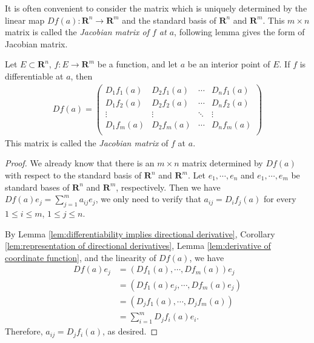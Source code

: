 It is often convenient to consider the matrix which is uniquely determined by the linear map $Df(a) : \mathbf{R}^n \to \mathbf{R}^m$ and the standard basis of $\mathbf{R}^n$ and $\mathbf{R}^m$. This $m \times n$ matrix is called the \emph{Jacobian matrix of $f$ at $a$}, following lemma gives the form of Jacobian matrix.

\begin{lemma}
    Let $E \subset \mathbf{R}^n$, $f : E \to \mathbf{R}^m$ be a function, and let $a$ be an interior point of $E$. If $f$ is differentiable at $a$, then
        \begin{align*}
            Df(a) = \left(\begin{matrix}
                D_1f_1(a)   &   D_2f_1(a)   &   \cdots  &   D_nf_1(a)\\
            D_1f_2(a)   &   D_2f_2(a)   &   \cdots  &   D_nf_2(a)\\
            \vdots      &   \vdots      &   \ddots  &   \vdots\\
            D_1f_m(a)   &   D_2f_m(a)   &   \cdots  &   D_nf_m(a)\\
            \end{matrix}\right)
        \end{align*}
    This matrix is called the \emph{Jacobian matrix} of $f$ at $a$.
\end{lemma}

\begin{proof}
    We already know that there is an $m \times n$ matrix determined by $Df(a)$ with respect to the standard basis of $\mathbf{R}^n$ and $\mathbf{R}^m$. Let $e_1, \cdots, e_n$ and $e_1, \cdots, e_m$ be standard bases of $\mathbf{R}^n$ and $\mathbf{R}^m$, respectively. Then we have $Df(a)e_j = \sum_{j = 1}^{m}a_{ij}e_j$, we only need to verify that $a_{ij} = D_if_j(a)$ for every $1 \leq i \leq m$, $1 \leq j \leq n$.

    By Lemma \ref{lem:differentiability implies directional derivative}, Corollary \ref{lem:representation of directional derivatives}, Lemma \ref{lem:derivative of coordinate function}, and the linearity of $Df(a)$, we have
    \begin{align*}
        Df(a)e_j
        &= (Df_1(a), \cdots, Df_m(a))e_j\\
        &= (Df_1(a)e_j, \cdots, Df_m(a)e_j)\\
        &= (D_jf_1(a), \cdots, D_jf_m(a))\\
        &= \sum_{i = 1}^{m}D_jf_i(a)e_i.
    \end{align*}
Therefore, $a_{ij} = D_jf_i(a)$, as desired.
\end{proof}

